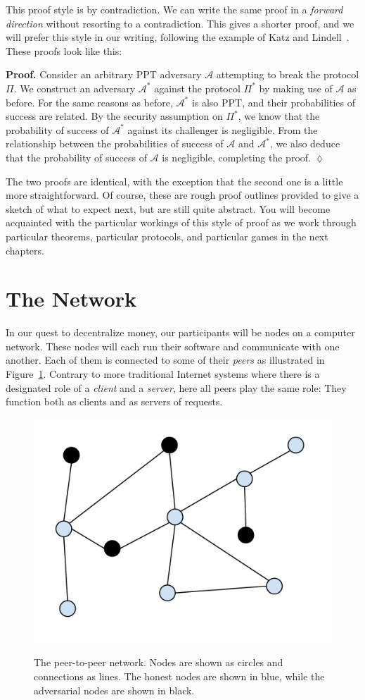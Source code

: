 This proof style is by contradiction. We can write the same proof in a \emph{forward
direction} without resorting to a contradiction. This gives a shorter proof, and we
will prefer this style in our writing, following the example of Katz and
Lindell~\cite{katz}. These proofs look like this:

\noindent
\textbf{Proof. } Consider an arbitrary PPT adversary $\mathcal{A}$ attempting to break
the protocol $\Pi$. We construct an adversary $\mathcal{A}^*$ against the protocol
$\Pi^*$ by making use of $\mathcal{A}$ as before. For the same reasons as before,
$\mathcal{A}^*$ is also PPT, and their probabilities of success are related. By the
security assumption on $\Pi^*$, we know that the probability of success of $\mathcal{A}^*$
against its challenger is negligible. From the relationship between the probabilities
of success of $\mathcal{A}$ and $\mathcal{A}^*$, we also deduce that the probability
of success of $\mathcal{A}$ is negligible, completing the proof. $\lozenge$

The two proofs are identical, with the exception that the second one is a little more
straightforward. Of course, these are rough proof outlines provided to give a sketch
of what to expect next, but are still quite abstract.
You will become acquainted with the particular workings of this style of proof as we work
through particular theorems, particular protocols, and particular games in the next chapters.

\section{The Network}

In our quest to decentralize money, our participants will be nodes on a computer network.
These nodes will each run their software and communicate with one another. Each of them
is connected to some of their \emph{peers} as illustrated in Figure~\ref{fig.network}.
Contrary to more traditional Internet systems where there is a designated role of a
\emph{client} and a \emph{server}, here all peers play the same role: They function both
as clients and as servers of requests.

\begin{figure}[h]
    \centering
    \includegraphics[width=0.5 \columnwidth,keepaspectratio]{figures/peer-to-peer-network.pdf}
    \label{fig.network}
    \caption{The peer-to-peer network. Nodes are shown as circles and connections as lines.
    The honest nodes are shown in blue, while the adversarial nodes are shown in black.}
\end{figure}

